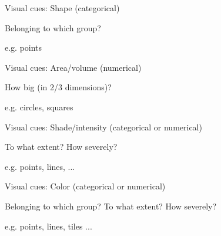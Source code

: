 \documentclass[table]{beamer}\usepackage[]{graphicx}\usepackage[]{xcolor}
\begin{document}

\begin{frame}[fragile]{Visual cues: Shape (categorical)}

\begin{block}{Belonging to which group?}

e.g. points

\end{block}

\vspace{15em}

\end{frame}


\begin{frame}[fragile]{Visual cues: Area/volume (numerical)}

\begin{block}{How big (in 2/3 dimensions)?}

e.g. circles, squares

\end{block}

\vspace{15em}

\end{frame}



\begin{frame}[fragile]{Visual cues: Shade/intensity (categorical or numerical)}

\begin{block}{To what extent? How severely?}

e.g. points, lines, ...

\end{block}

\vspace{15em}

\end{frame}


\begin{frame}[fragile]{Visual cues: Color  (categorical or numerical)}

\begin{block}{Belonging to which group? To what extent? How severely?}

e.g. points, lines, tiles ...

\end{block}

\vspace{15em}

\end{frame}
\end{document}
